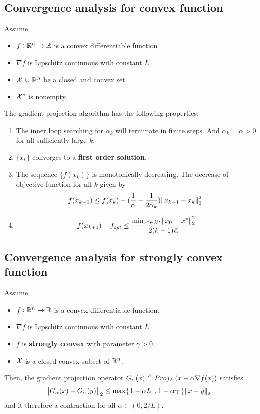 \begin{refsection}
\subsection{Convergence analysis for convex function}
\begin{theorem}
Assume
\begin{itemize}
	\item $f:\mathbb{R}^n\to \mathbb{R}$ is a convex differentiable function
	\item $\nabla f$ is Lipschitz continuous with constant $L$
	\item $\mathcal{X} \subseteq \mathbb{R}^n$ be a closed and convex set
	\item $\mathcal{X}^*$ is nonempty.
\end{itemize}
The gradient projection algorithm has the following properties:
\begin{enumerate}
	\item The inner loop searching for $\alpha_k$ will terminate in finite steps. And $\alpha_k = \bar{\alpha} > 0$ for all sufficiently large $k$.
	\item $\{x_k\}$ converges to a \textbf{first order solution}.
	\item The sequence $\{f(x_k)\}$ is monotonically decreasing. The decrease of objective function for all $k$ given by
	$$f(x_{k+1}) \leq f(x_k) - (\frac{1}{\alpha} - \frac{1}{2\alpha_k})\norm{x_{k+1}-x_k}_2^2.$$
	\item 
	$$f(x_{k+1}) - f_{opt} \leq \frac{\min_{x^*\in \mathcal{X}^*}\norm{x_0 - x^*}_2^2}{2(k+1)\bar{\alpha}}$$
	
\end{enumerate}
\end{theorem}


\subsection{Convergence analysis for strongly convex function}
\begin{lemma}
Assume
\begin{itemize}
	\item $f:\mathbb{R}^n\to \mathbb{R}$ is a convex differentiable function.
	\item $\nabla f$ is Lipschitz continuous with constant $L$.
	\item $f$ is \textbf{strongly convex} with parameter $\gamma > 0$.
	\item $\mathcal{X}$ is a closed convex subset of $\mathbb{R}^n$.
\end{itemize}	
Then, the gradient projection operator $G_\alpha(x) \triangleq Proj_{\mathcal{X}} (x - \alpha \nabla f(x))$ satisfies
$$\norm{G_\alpha(x) - G_\alpha(y)}_2 \leq \max\{\abs{1-\alpha L},\abs{1-\alpha \gamma}\} \norm{x - y}_2,$$
and it therefore a contraction for all $\alpha \in (0,2/L)$.
\end{lemma}



\end{refsection}

